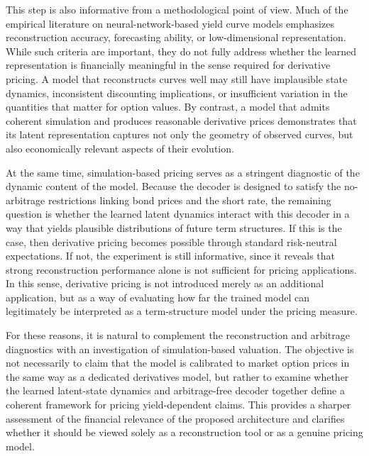 This step is also informative from a methodological point of view. 
Much of the empirical literature on neural-network-based yield curve models emphasizes reconstruction accuracy, forecasting ability, or low-dimensional representation. 
While such criteria are important, they do not fully address whether the learned representation is financially meaningful in the sense required for derivative pricing. 
A model that reconstructs curves well may still have implausible state dynamics, inconsistent discounting implications, or insufficient variation in the quantities that matter for option values. 
By contrast, a model that admits coherent simulation and produces reasonable derivative prices demonstrates that its latent representation captures not only the geometry of observed curves, but also economically relevant aspects of their evolution.

At the same time, simulation-based pricing serves as a stringent diagnostic of the dynamic content of the model. 
Because the decoder is designed to satisfy the no-arbitrage restrictions linking bond prices and the short rate, the remaining question is whether the learned latent dynamics interact with this decoder in a way that yields plausible distributions of future term structures. 
If this is the case, then derivative pricing becomes possible through standard risk-neutral expectations. 
If not, the experiment is still informative, since it reveals that strong reconstruction performance alone is not sufficient for pricing applications. 
In this sense, derivative pricing is not introduced merely as an additional application, but as a way of evaluating how far the trained model can legitimately be interpreted as a term-structure model under the pricing measure.

For these reasons, it is natural to complement the reconstruction and arbitrage diagnostics with an investigation of simulation-based valuation. 
The objective is not necessarily to claim that the model is calibrated to market option prices in the same way as a dedicated derivatives model, but rather to examine whether the learned latent-state dynamics and arbitrage-free decoder together define a coherent framework for pricing yield-dependent claims. 
This provides a sharper assessment of the financial relevance of the proposed architecture and clarifies whether it should be viewed solely as a reconstruction tool or as a genuine pricing model.